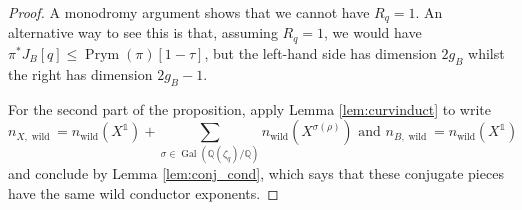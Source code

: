 \documentclass[10pt,a4paper]{amsart}
\DeclareMathOperator{\Gal}{Gal}
\DeclareMathOperator{\Prym}{Prym}
\newcommand{\QQ}{\mathbb{Q}}
\DeclareMathOperator{\one}{\mathds{1}}
\DeclareMathOperator{\wild}{wild}
\begin{document}
\begin{proof}
    A monodromy argument shows that we cannot have $R_q=1$. An alternative way to see this is that, assuming $R_q=1$, we would have $\pi^*J_B[q]\le \Prym(\pi)[1-\tau]$, but the left-hand side has dimension $2g_B$ whilst the right has dimension $2g_B-1$. 

    For the second part of the proposition, apply Lemma \ref{lem:curvinduct} to write 
    \[n_{X,\wild}=n_{\wild}(X^{\one})+\sum_{\sigma\in\Gal(\QQ(\zeta_q)/\QQ)}n_{\wild}(X^{\sigma(\rho)}) \text{ and } n_{B,\wild}= n_{\wild}(X^{\one})\]
    and conclude by Lemma \ref{lem:conj_cond}, which says that these conjugate pieces have the same wild conductor exponents.
\end{proof}
\end{document}
